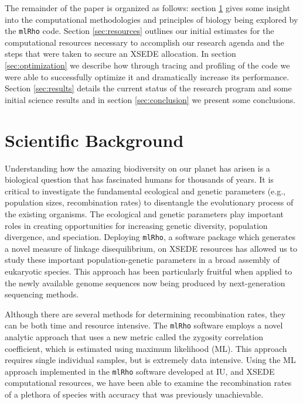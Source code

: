 \documentclass{sig-alternate}
\begin{document}
The remainder of the paper is organized as follows: section \ref{sec:background} gives some insight into the
computational methodologies and principles of biology being explored by the \texttt{mlRho} code. Section
\ref{sec:resources} outlines our initial estimates for the computational resources necessary to accomplish our
research agenda and the steps that were taken to secure an XSEDE allocation. In section \ref{sec:optimization}
we describe how through tracing and profiling of the code we were able to successfully optimize it and
dramatically increase its performance. Section \ref{sec:results} details the current status of the research
program and some initial science results and in section \ref{sec:conclusion} we present some conclusions.


\section{Scientific Background}\label{sec:background}
Understanding how the amazing biodiversity on our planet has arisen is a biological question that has
fascinated humans for thousands of years. It is critical to investigate the fundamental ecological and genetic
parameters (e.g., population sizes, recombination rates) to disentangle the evolutionary process of the
existing organisms. The ecological and genetic parameters play important roles in creating opportunities for
increasing genetic diversity, population divergence, and speciation. Deploying \texttt{mlRho}, a software package which
generates a novel measure of linkage disequilibrium, on XSEDE resources has allowed us to study these
important population-genetic parameters in a broad assembly of eukaryotic species. This approach has been
particularly fruitful when applied to the newly available genome sequences now being produced by
next-generation sequencing methods.

Although there are several methods for determining recombination rates, they can be both time and resource
intensive. The \texttt{mlRho} software employs a novel analytic approach that uses a new metric called the zygosity
correlation coefficient, which is estimated using maximum likelihood (ML). This approach requires single individual
samples, but is extremely data intensive. Using the ML approach implemented in the \texttt{mlRho} software developed at
IU, and XSEDE computational resources, we have been able to examine the recombination rates of a plethora of
species with accuracy that was previously unachievable.
\end{document}
